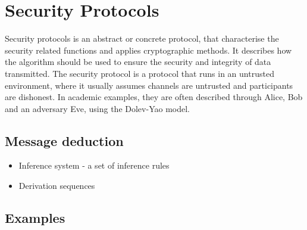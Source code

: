 \section{Security Protocols} %
Security protocols is an abstract or concrete protocol, that characterise the security related functions and applies cryptographic methods. It describes how the algorithm should be used to ensure the security and integrity of data transmitted. The security protocol is a protocol that runs in an untrusted environment, where it usually assumes channels are untrusted and participants are dishonest. In academic examples, they are often described through Alice, Bob and an adversary Eve, using the Dolev-Yao model.

\subsection{Message deduction}
\begin{itemize}
  	\item Inference system - a set of inference rules
  	\item Derivation sequences
\end{itemize}

\subsection{Examples}

